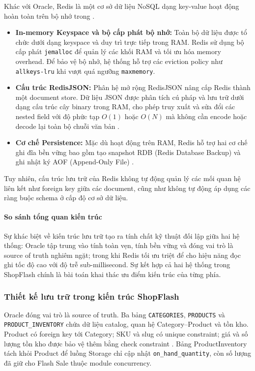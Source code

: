 Khác với Oracle, Redis là một cơ sở dữ liệu NoSQL dạng key-value hoạt động hoàn toàn trên bộ nhớ trong \cite{redisDataTypes}.
\begin{itemize}[label=--]
    \item \textbf{In-memory Keyspace và bộ cấp phát bộ nhớ:} Toàn bộ dữ liệu được tổ chức dưới dạng keyspace và duy trì trực tiếp trong RAM. Redis sử dụng bộ cấp phát \texttt{jemalloc} để quản lý các khối RAM và tối ưu hóa memory overhead. Để bảo vệ bộ nhớ, hệ thống hỗ trợ các eviction policy như \texttt{allkeys-lru} khi vượt quá ngưỡng \texttt{maxmemory}.
    
    \item \textbf{Cấu trúc RedisJSON:} Phân hệ mở rộng RedisJSON nâng cấp Redis thành một document store. Dữ liệu JSON được phân tích cú pháp và lưu trữ dưới dạng cấu trúc cây binary trong RAM, cho phép truy xuất và sửa đổi các nested field với độ phức tạp $O(1)$ hoặc $O(N)$ mà không cần encode hoặc decode lại toàn bộ chuỗi văn bản \cite{redisJson}.
    
    \item \textbf{Cơ chế Persistence:} Mặc dù hoạt động trên RAM, Redis hỗ trợ hai cơ chế ghi đĩa bền vững bao gồm tạo snapshot RDB (Redis Database Backup) và ghi nhật ký AOF (Append-Only File) \cite{redisPersistence}.
\end{itemize}

Tuy nhiên, cấu trúc lưu trữ của Redis không tự động quản lý các mối quan hệ liên kết như foreign key giữa các document, cũng như không tự động áp dụng các ràng buộc schema ở cấp độ cơ sở dữ liệu.

\paragraph{So sánh tổng quan kiến trúc}

Sự khác biệt về kiến trúc lưu trữ tạo ra tính chất kỹ thuật đối lập giữa hai hệ thống: Oracle tập trung vào tính toàn vẹn, tính bền vững và đóng vai trò là source of truth nghiêm ngặt; trong khi Redis tối ưu triệt để cho hiệu năng đọc ghi tốc độ cao với độ trễ sub-millisecond. Sự kết hợp cả hai hệ thống trong ShopFlash chính là bài toán khai thác ưu điểm kiến trúc của từng phía.

\subsubsection{Thiết kế lưu trữ trong kiến trúc ShopFlash}

Oracle đóng vai trò là source of truth. Ba bảng \texttt{CATEGORIES}, \texttt{PRODUCTS} và \texttt{PRODUCT\_INVENTORY} chứa dữ liệu catalog, quan hệ Category--Product và tồn kho. Product có foreign key tới Category; SKU và slug có unique constraint; giá và số lượng tồn kho được bảo vệ thêm bằng check constraint \cite{oracleConstraints}. Bảng ProductInventory tách khỏi Product để luồng Storage chỉ cập nhật \texttt{on\_hand\_quantity}, còn số lượng đã giữ cho Flash Sale thuộc module concurrency.

